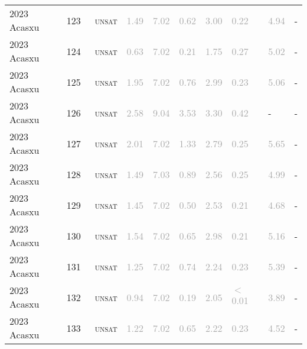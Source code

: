 \begin{center}
{\begin{longtable}{@{}llllllllll@{}}
2023 Acasxu & 123 & ~\textsc{unsat} & \textcolor{darkgray}{1.49} & \textcolor{darkgray}{7.02} & \textcolor{darkgray}{0.62} & \textcolor{darkgray}{3.00} & \textcolor{darkgray}{0.22} & \textcolor{darkgray}{4.94} & - \\
2023 Acasxu & 124 & ~\textsc{unsat} & \textcolor{darkgray}{0.63} & \textcolor{darkgray}{7.02} & \textcolor{darkgray}{0.21} & \textcolor{darkgray}{1.75} & \textcolor{darkgray}{0.27} & \textcolor{darkgray}{5.02} & - \\
2023 Acasxu & 125 & ~\textsc{unsat} & \textcolor{darkgray}{1.95} & \textcolor{darkgray}{7.02} & \textcolor{darkgray}{0.76} & \textcolor{darkgray}{2.99} & \textcolor{darkgray}{0.23} & \textcolor{darkgray}{5.06} & - \\
2023 Acasxu & 126 & ~\textsc{unsat} & \textcolor{darkgray}{2.58} & \textcolor{darkgray}{9.04} & \textcolor{darkgray}{3.53} & \textcolor{darkgray}{3.30} & \textcolor{darkgray}{0.42} & - & - \\
2023 Acasxu & 127 & ~\textsc{unsat} & \textcolor{darkgray}{2.01} & \textcolor{darkgray}{7.02} & \textcolor{darkgray}{1.33} & \textcolor{darkgray}{2.79} & \textcolor{darkgray}{0.25} & \textcolor{darkgray}{5.65} & - \\
2023 Acasxu & 128 & ~\textsc{unsat} & \textcolor{darkgray}{1.49} & \textcolor{darkgray}{7.03} & \textcolor{darkgray}{0.89} & \textcolor{darkgray}{2.56} & \textcolor{darkgray}{0.25} & \textcolor{darkgray}{4.99} & - \\
2023 Acasxu & 129 & ~\textsc{unsat} & \textcolor{darkgray}{1.45} & \textcolor{darkgray}{7.02} & \textcolor{darkgray}{0.50} & \textcolor{darkgray}{2.53} & \textcolor{darkgray}{0.21} & \textcolor{darkgray}{4.68} & - \\
2023 Acasxu & 130 & ~\textsc{unsat} & \textcolor{darkgray}{1.54} & \textcolor{darkgray}{7.02} & \textcolor{darkgray}{0.65} & \textcolor{darkgray}{2.98} & \textcolor{darkgray}{0.21} & \textcolor{darkgray}{5.16} & - \\
2023 Acasxu & 131 & ~\textsc{unsat} & \textcolor{darkgray}{1.25} & \textcolor{darkgray}{7.02} & \textcolor{darkgray}{0.74} & \textcolor{darkgray}{2.24} & \textcolor{darkgray}{0.23} & \textcolor{darkgray}{5.39} & - \\
2023 Acasxu & 132 & ~\textsc{unsat} & \textcolor{darkgray}{0.94} & \textcolor{darkgray}{7.02} & \textcolor{darkgray}{0.19} & \textcolor{darkgray}{2.05} & \textcolor{darkgray}{$<$0.01} & \textcolor{darkgray}{3.89} & - \\
2023 Acasxu & 133 & ~\textsc{unsat} & \textcolor{darkgray}{1.22} & \textcolor{darkgray}{7.02} & \textcolor{darkgray}{0.65} & \textcolor{darkgray}{2.22} & \textcolor{darkgray}{0.23} & \textcolor{darkgray}{4.52} & - \\

\end{longtable}}
\end{center}
